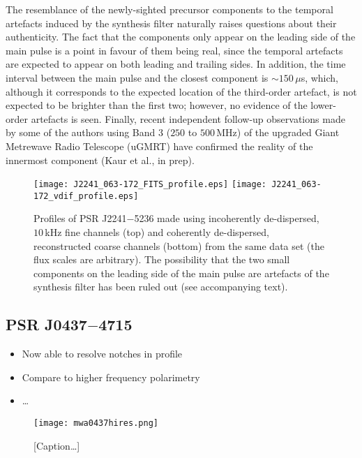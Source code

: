 \documentclass{pasa}%
\newcommand{\psrkaurJ}{J2241$-$5236}
\newcommand{\psrbhatJ}{J0437$-$4715}
\begin{document}
The resemblance of the newly-sighted precursor components to the temporal artefacts induced by the synthesis filter naturally raises questions about their authenticity.
The fact that the components only appear on the leading side of the main pulse is a point in favour of them being real, since the temporal artefacts are expected to appear on both leading and trailing sides.
In addition, the time interval between the main pulse and the closest component is $\sim150\,\mu$s, which, although it corresponds to the expected location of the third-order artefact, is not expected to be brighter than the first two; however, no evidence of the lower-order artefacts is seen.
Finally, recent independent follow-up observations made by some of the authors using Band 3 ($250$ to $500\,$MHz) of the upgraded Giant Metrewave Radio Telescope (uGMRT) have confirmed the reality of the innermost component (Kaur et al., in prep).

\begin{figure}[t!]
    \centering
    \texttt{[image: J2241\_063-172\_FITS\_profile.eps]}
    \texttt{[image: J2241\_063-172\_vdif\_profile.eps]}
    \caption{Profiles of PSR \psrkaurJ{} made using incoherently de-dispersed, $10\,$kHz fine channels (top) and coherently de-dispersed, reconstructed coarse channels (bottom) from the same data set \citep{Kaur2019} (the flux scales are arbitrary). The possibility that the two small components on the leading side of the main pulse are artefacts of the synthesis filter has been ruled out (see accompanying text).}
    \label{fig:J2241_profiles}
\end{figure}

\subsection{PSR \psrbhatJ{}}

\begin{itemize}
    \item Now able to resolve notches in profile
    \item Compare to higher frequency polarimetry
    \item \dots
\end{itemize}

\begin{figure}[t!]
    \centering
    \texttt{[image: mwa0437hires.png]}
    \caption{[Caption\dots]}
    \label{fig:0437}
\end{figure}
\end{document}
